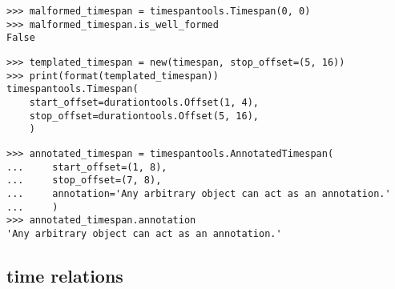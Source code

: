 \begin{comment}
<abjad>
malformed_timespan = timespantools.Timespan(0, 0)
malformed_timespan.is_well_formed
</abjad>
\end{comment}

\begin{singlespacing}
\begin{lstlisting}
>>> malformed_timespan = timespantools.Timespan(0, 0)
>>> malformed_timespan.is_well_formed
False
\end{lstlisting}
\end{singlespacing}

\begin{comment}
<abjad>
templated_timespan = new(timespan, stop_offset=(5, 16))
print(format(templated_timespan))
</abjad>
\end{comment}

\begin{singlespacing}
\begin{lstlisting}
>>> templated_timespan = new(timespan, stop_offset=(5, 16))
>>> print(format(templated_timespan))
timespantools.Timespan(
    start_offset=durationtools.Offset(1, 4),
    stop_offset=durationtools.Offset(5, 16),
    )
\end{lstlisting}
\end{singlespacing}

\begin{comment}
<abjad>
annotated_timespan = timespantools.AnnotatedTimespan(
    start_offset=(1, 8),
    stop_offset=(7, 8),
    annotation='Any arbitrary object can act as an annotation.'
    )
annotated_timespan.annotation
</abjad>
\end{comment}

\begin{singlespacing}
\begin{lstlisting}
>>> annotated_timespan = timespantools.AnnotatedTimespan(
...     start_offset=(1, 8),
...     stop_offset=(7, 8),
...     annotation='Any arbitrary object can act as an annotation.'
...     )
>>> annotated_timespan.annotation
'Any arbitrary object can act as an annotation.'
\end{lstlisting}
\end{singlespacing}

\subsection{time relations}

